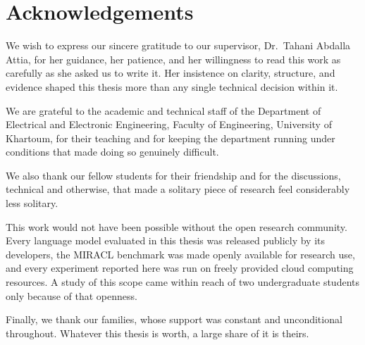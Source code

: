 \chapter*{Acknowledgements}

We wish to express our sincere gratitude to our supervisor, Dr.~Tahani Abdalla Attia,
for her guidance, her patience, and her willingness to read this work as carefully as
she asked us to write it. Her insistence on clarity, structure, and evidence shaped
this thesis more than any single technical decision within it.

We are grateful to the academic and technical staff of the Department of Electrical
and Electronic Engineering, Faculty of Engineering, University of Khartoum, for their
teaching and for keeping the department running under conditions that made doing so
genuinely difficult.

We also thank our fellow students for their friendship and for the discussions,
technical and otherwise, that made a solitary piece of research feel considerably less
solitary.

This work would not have been possible without the open research community. Every
language model evaluated in this thesis was released publicly by its developers, the
MIRACL benchmark was made openly available for research use, and every experiment
reported here was run on freely provided cloud computing resources. A study of this
scope came within reach of two undergraduate students only because of that openness.

Finally, we thank our families, whose support was constant and unconditional
throughout. Whatever this thesis is worth, a large share of it is theirs.

